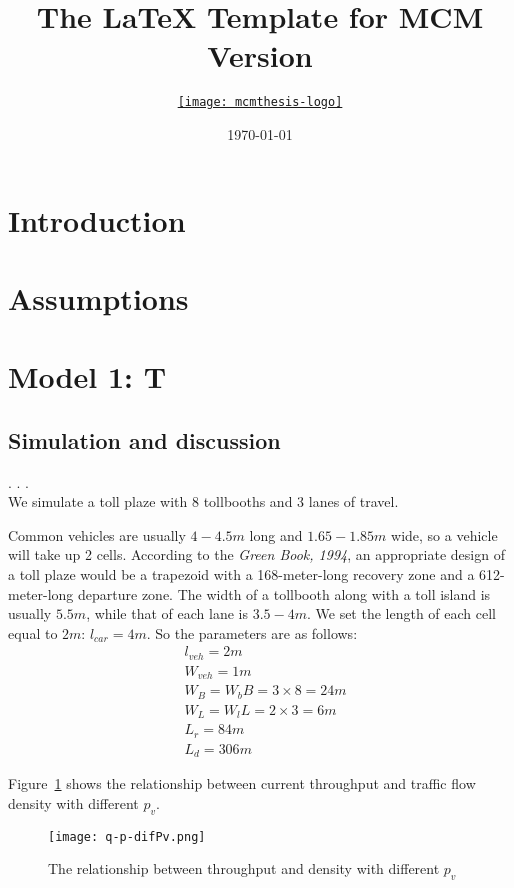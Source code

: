 \documentclass{mcmthesis}
\title{The \LaTeX{} Template for MCM Version \MCMversion}
\author{\small \href{http://www.latexstudio.net/}
  {\texttt{[image: mcmthesis-logo]}}}
\date{\today}
\begin{document}
\section{Introduction}
\section{Assumptions}
\section{Model 1: T}
\subsection{Simulation and discussion}
.
.
.
\\
We simulate a toll plaze with 8 tollbooths and 3 lanes of travel.

Common vehicles are usually $4-4.5m$ long and $1.65-1.85m$ wide,
so a vehicle will take up 2 cells.
According to the \emph{Green Book, 1994}, an appropriate design of
a toll plaze would be a trapezoid with a
168-meter-long recovery zone and a 612-meter-long departure zone.
The width of a tollbooth along with a toll island
is usually $5.5m$, while that of each lane is $3.5-4m$.
We set the length of each cell equal to $2m$: $l_{car}=4m$.
So the parameters are as follows:
\[
\begin{align*}
&{l}_{veh}=2m\\
&{W}_{veh}=1m\\
&W_{B}={W}_{b}B=3\times8=24m\\
&W_{L}={W}_{l}L=2\times3=6m\\
&{L}_{r}=84m\\
&{L}_{d}=306m
\end{align*}
\]



Figure~\ref{fig:q-p} shows the relationship between current throughput and
traffic flow density with different ${p}_{v}$.


\begin{figure}[h]
\small
\centering
\texttt{[image: q-p-difPv.png]}
\caption{The relationship between throughput and density with different ${p}_{v}$}
\label{fig:q-p}

\end{figure}
\end{document}
